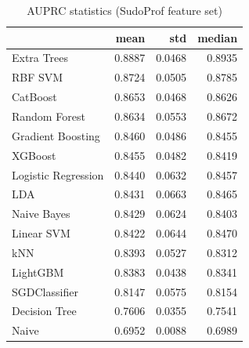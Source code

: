 \begin{table}
\caption{AUPRC statistics (SudoProf feature set)}
\label{tab:auprc_SudoProf_stats}
\begin{tabular}{lrrr}
\toprule
 & mean & std & median \\
\midrule
Extra Trees & 0.8887 & 0.0468 & 0.8935 \\
RBF SVM & 0.8724 & 0.0505 & 0.8785 \\
CatBoost & 0.8653 & 0.0468 & 0.8626 \\
Random Forest & 0.8634 & 0.0553 & 0.8672 \\
Gradient Boosting & 0.8460 & 0.0486 & 0.8455 \\
XGBoost & 0.8455 & 0.0482 & 0.8419 \\
Logistic Regression & 0.8440 & 0.0632 & 0.8457 \\
LDA & 0.8431 & 0.0663 & 0.8465 \\
Naive Bayes & 0.8429 & 0.0624 & 0.8403 \\
Linear SVM & 0.8422 & 0.0644 & 0.8470 \\
kNN & 0.8393 & 0.0527 & 0.8312 \\
LightGBM & 0.8383 & 0.0438 & 0.8341 \\
SGDClassifier & 0.8147 & 0.0575 & 0.8154 \\
Decision Tree & 0.7606 & 0.0355 & 0.7541 \\
Naive & 0.6952 & 0.0088 & 0.6989 \\
\bottomrule
\end{tabular}
\end{table}
